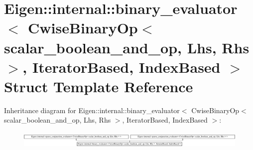\hypertarget{struct_eigen_1_1internal_1_1binary__evaluator_3_01_cwise_binary_op_3_01scalar__boolean__and__op_e9805903bdca4d8b3e2f0d1430158176}{}\section{Eigen\+:\+:internal\+:\+:binary\+\_\+evaluator$<$ Cwise\+Binary\+Op$<$ scalar\+\_\+boolean\+\_\+and\+\_\+op, Lhs, Rhs $>$, Iterator\+Based, Index\+Based $>$ Struct Template Reference}
\label{struct_eigen_1_1internal_1_1binary__evaluator_3_01_cwise_binary_op_3_01scalar__boolean__and__op_e9805903bdca4d8b3e2f0d1430158176}
Inheritance diagram for Eigen\+:\+:internal\+:\+:binary\+\_\+evaluator$<$ Cwise\+Binary\+Op$<$ scalar\+\_\+boolean\+\_\+and\+\_\+op, Lhs, Rhs $>$, Iterator\+Based, Index\+Based $>$\+:\begin{figure}[H]
\begin{center}
\leavevmode
\includegraphics[height=0.810420cm]{struct_eigen_1_1internal_1_1binary__evaluator_3_01_cwise_binary_op_3_01scalar__boolean__and__op_e9805903bdca4d8b3e2f0d1430158176}
\end{center}
\end{figure}
